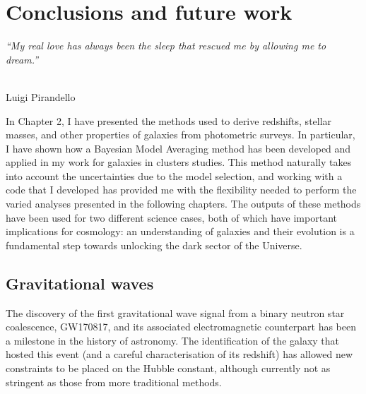\chapter{Conclusions and future work}\label{chp:chp7}

\begin{flushright}
  {\em ``My real love has always been the sleep that rescued me by allowing me to dream.''}\\

\ \

\normalsize
{Luigi Pirandello}  
\end{flushright}



In Chapter 2, I have presented the methods used to derive redshifts, stellar masses, and other properties of galaxies from photometric surveys. In particular, I have shown how a Bayesian Model Averaging method has been developed and applied in my work for galaxies in clusters studies. This method naturally takes into account the uncertainties due to the model selection, and working with a code that I developed has provided me with the flexibility needed to perform the varied analyses presented in the following chapters. The outputs of these methods have been used for two different science cases, both of which have important implications for cosmology: an understanding of galaxies and their evolution is a fundamental step towards unlocking the dark sector of the Universe.

\section{Gravitational waves}

The discovery of the first gravitational wave signal from a binary neutron star coalescence, GW170817, and its associated electromagnetic counterpart has been a milestone in the history of astronomy. The identification of the galaxy that hosted this event (and a careful characterisation of its redshift) has allowed new constraints to be placed on the Hubble constant, although currently not as stringent as those from more traditional methods. 

